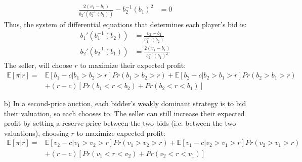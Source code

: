 \documentclass{article}
\newcommand{\E}[1]{\mathbb{E}\left[#1\right]} %
\begin{document}
\begin{itemize}
\begin{align*}
		\frac{2(v_1-b_1)}{b_2'\left(b_2^{-1}(b_1)\right)} - b_2^{-1}(b_1)^2 &= 0	
	\end{align*}
	Thus, the system of differential equations that determines each player's bid is:
	\begin{align*}
		b_1'\left(b_1^{-1}(b_2)\right)	&= \frac{v_2-b_2}{b_1^{-1}(b_2) }		\\
		b_2'\left(b_2^{-1}(b_1)\right)	&= \frac{2(v_1-b_1)}{b_2^{-1}(b_1)^2}	
	\end{align*}
	The seller, will choose $r$ to maximize their expected profit:
	{\small \begin{align*}
		\E{\pi|r} = &\E{b_1-c|b_1>b_2>r}Pr(b_1>b_2>r) + \E{b_2-c|b_2>b_1>r}Pr(b_2>b_1>r) 	\\
					&+ (r-c)\left[Pr(b_1<r<b_2) + Pr(b_2<r<b_1)\right]
	\end{align*} }
	
	\item[b)] In a second-price auction, each bidder's weakly dominant strategy is to bid their valuation, so each chooses to. The seller can still increase their expected profit by setting a reserve price between the two bids (i.e. between the two valuations), choosing $r$ to maximize expected profit:
	{\small \begin{align*}
		\E{\pi|r} = &\E{v_2-c|v_1>v_2>r}Pr(v_1>v_2>r) + \E{v_1-c|v_2>v_1>r}Pr(v_2>v_1>r) 	\\
					&+ (r-c)\left[Pr(v_1<r<v_2) + Pr(v_2<r<v_1)\right]
	\end{align*} }
	


\end{itemize}
\end{document}
